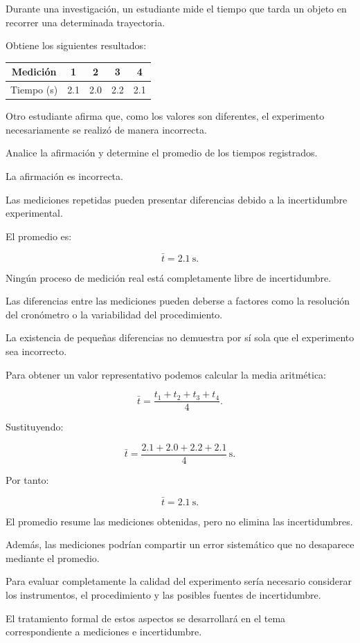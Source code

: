 \begin{ejercicio}
Durante una investigación, un estudiante mide el tiempo que tarda un objeto en recorrer una determinada trayectoria.

Obtiene los siguientes resultados:

\begin{center}
\begin{tabular}{c|cccc}
\hline
Medición & 1 & 2 & 3 & 4 \\
\hline
Tiempo (\si{\second}) & 2.1 & 2.0 & 2.2 & 2.1 \\
\hline
\end{tabular}
\end{center}

Otro estudiante afirma que, como los valores son diferentes, el experimento necesariamente se realizó de manera incorrecta.

Analice la afirmación y determine el promedio de los tiempos registrados.
\end{ejercicio}

\begin{respuesta}
La afirmación es incorrecta.

Las mediciones repetidas pueden presentar diferencias debido a la incertidumbre experimental.

El promedio es:

\[\boxed{\bar{t}=\SI{2.1}{\second}}.\]
\end{respuesta}

\begin{explicacion}
Ningún proceso de medición real está completamente libre de incertidumbre.

Las diferencias entre las mediciones pueden deberse a factores como la resolución del cronómetro o la variabilidad del procedimiento.

La existencia de pequeñas diferencias no demuestra por sí sola que el experimento sea incorrecto.

Para obtener un valor representativo podemos calcular la media aritmética:

\[\bar{t}=\frac{t_1+t_2+t_3+t_4}{4}.\]

Sustituyendo:

\[\bar{t}=\frac{2.1+2.0+2.2+2.1}{4}\,\si{\second}.\]

Por tanto:

\[\boxed{\bar{t}=\SI{2.1}{\second}}.\]

El promedio resume las mediciones obtenidas, pero no elimina las incertidumbres.

Además, las mediciones podrían compartir un error sistemático que no desaparece mediante el promedio.

Para evaluar completamente la calidad del experimento sería necesario considerar los instrumentos, el procedimiento y las posibles fuentes de incertidumbre.

El tratamiento formal de estos aspectos se desarrollará en el tema correspondiente a mediciones e incertidumbre.
\end{explicacion}


